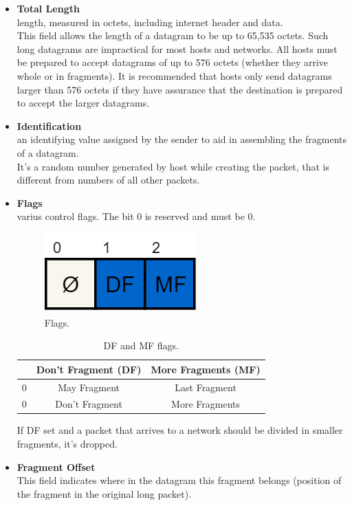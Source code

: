 \begin{itemize}
{}
\item{\textbf{Total Length}\\
length, measured in octets, including internet header and data.\\
This field allows the length of a datagram to be up to 65,535 octets. Such long datagrams are impractical for most hosts and networks.  All hosts must be prepared to accept datagrams of up to 576 octets (whether they arrive whole or in fragments).  It is recommended that hosts only send datagrams larger than 576 octets if they have assurance that the destination is prepared to accept the larger datagrams.
}
\item{\textbf{Identification}\\
an identifying value assigned by the sender to aid in assembling the fragments of a datagram.\\
It's a random number generated by host while creating the packet, that is different from numbers of all other packets.
}
\item{\textbf{Flags}\\
varius control flags. The bit 0 is reserved and must be 0.
\begin{figure}[h]
\centering
\includegraphics[scale=0.3]{Images/IP/flags}
\caption{\footnotesize{Flags.}}\label{flags}
\end{figure}
\begin{table}[H]
\centering \footnotesize
\begin{tabular}{|c|c|c|}
\cline{2-3}
\multicolumn{1}{c|}{}&{Don't Fragment (DF)}&{More Fragments (MF)}\\
\hline
{0}&{May Fragment}&{Last Fragment}\\
\hline
{0}&{Don't Fragment}&{More Fragments}\\
\hline
\end{tabular}
\caption{DF and MF flags.}
\end{table}
If DF set and a packet that arrives to a network should be divided in smaller fragments, it's dropped.
}
\item{\textbf{Fragment Offset}\\
This field indicates where in the datagram this fragment belongs (position of the fragment in the original long packet).\\
}
\end{itemize}
